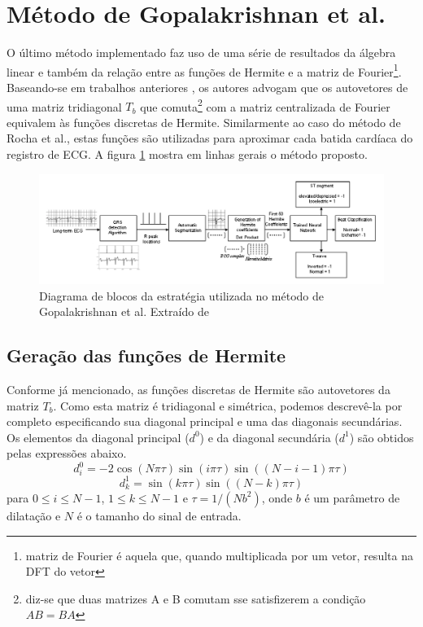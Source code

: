 
\section{Método de Gopalakrishnan et al.}
\label{sec:section4}

O último método implementado faz uso de uma série de resultados da álgebra linear e também da relação entre as funções de Hermite e a matriz de Fourier\footnote{matriz de Fourier é aquela que, quando multiplicada por um vetor, resulta na DFT do vetor}. Baseando-se em trabalhos anteriores \cite{Mugler02}, os autores advogam que os autovetores de uma matriz tridiagonal $T_b$ que comuta\footnote{diz-se que duas matrizes A e B comutam sse satisfizerem a condição $AB = BA$} com a matriz centralizada de Fourier equivalem às funções discretas de Hermite. Similarmente ao caso do método de Rocha et al., estas funções são utilizadas para aproximar cada batida cardíaca do registro de ECG. A figura \ref{fig:gopalak_01} mostra em linhas gerais o método proposto.

\begin{figure}[ht]
    \centering
    \includegraphics[width=1.0\textwidth]{figures/gopalak_01.png}
    \caption{Diagrama de blocos da estratégia utilizada no método de Gopalakrishnan et al. Extraído de \cite{Gopalak04}}
    \label{fig:gopalak_01}
\end{figure}

\subsection{Geração das funções de Hermite}
Conforme já mencionado, as funções discretas de Hermite são autovetores da matriz $T_b$. Como esta matriz é tridiagonal e simétrica, podemos descrevê-la por completo especificando sua diagonal principal e uma das diagonais secundárias. Os elementos da diagonal principal ($d^0$) e da diagonal secundária ($d^1$) são obtidos pelas expressões abaixo.
\begin{equation} \label{equ:main_diagonal}
    d^0_{i} = -2\cos(N\pi\tau)\sin(i\pi\tau)\sin((N-i-1)\pi\tau)
\end{equation}
\begin{equation} \label{equ:off_diagonal}
    d^1_{k} = \sin(k\pi\tau)\sin((N-k)\pi\tau)
\end{equation}
para $0\leq i\leq N-1$, $1\leq k\leq N-1$ e $\tau = 1/(Nb^2)$, onde $b$ é um parâmetro de dilatação e $N$ é o tamanho do sinal de entrada.

